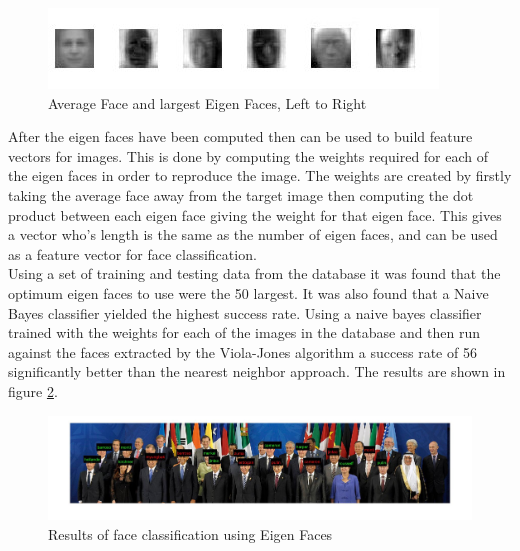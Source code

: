 \documentclass{article}
\begin{document}
\begin{figure}[H]
  \includegraphics[width=\linewidth]{eigenface.jpg}
  \caption{Average Face and largest Eigen Faces, Left to Right}
  \label{fig:eigenface}
\end{figure}

After the eigen faces have been computed then can be used to build feature vectors
for images. This is done by computing the weights required for each of the eigen
faces in order to reproduce the image. The weights are created by firstly taking
the average face away from the target image then computing the dot product
between each eigen face giving the weight for that eigen face. This gives a vector
who's length is the same as the number of eigen faces, and can be used as a feature
vector for face classification.\\

Using a set of training and testing data from the database it was found that the
optimum eigen faces to use were the 50 largest. It was also found that a Naive Bayes
classifier yielded the highest success rate. Using a naive bayes classifier trained with
the weights for each of the images in the database and then run against the faces
extracted by the Viola-Jones algorithm a success rate of 56%
significantly better than the nearest neighbor approach. The results are shown in
figure \ref{fig:eigenfaces}.

\begin{figure}[H]
  \includegraphics[width=\linewidth]{eigenfacesrun.jpg}
  \caption{Results of face classification using Eigen Faces}
  \label{fig:eigenfaces}
\end{figure}




\end{document}
